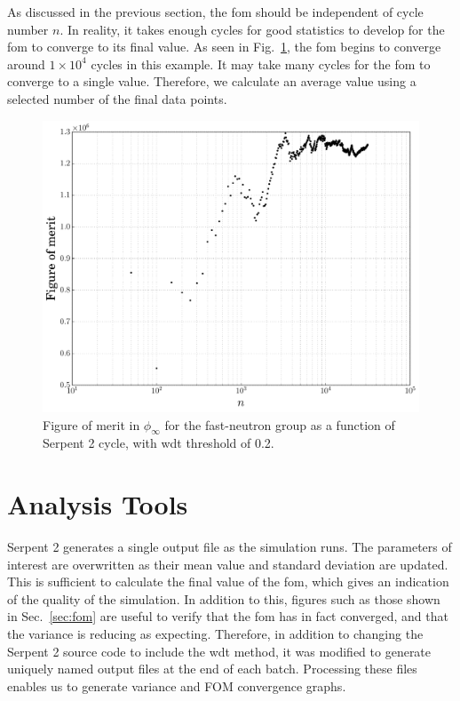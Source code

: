 As discussed in the previous section, the \gls{fom} should be
independent of cycle number $n$. In reality, it takes enough cycles
for good statistics to develop for the \gls{fom} to converge to its
final value. As seen in Fig.~\ref{fig:fom_convergence}, the \gls{fom}
begins to converge around $1\times 10^4$ cycles in this example. 
It may take many cycles for the
\gls{fom} to converge to a single value. Therefore, we calculate an
average value using a selected number of the final data points.
\begin{figure}[hbtp]
  \centering
  \includegraphics[scale=0.5]{images/fom_convergence_example}
  \caption[Figure of merit in $\phi_{\infty}$ for the fast-neutron group as a
    function of Serpent 2 cycle.]{Figure of merit in $\phi_{\infty}$ for the fast-neutron group as a
    function of Serpent 2 cycle, with \gls{wdt} threshold of 0.2.}
  \label{fig:fom_convergence}
\end{figure}

\section{Analysis Tools}
\label{sec:analysis}

Serpent 2 generates a single output file as the simulation runs. The
parameters of interest are overwritten as their mean value and
standard deviation are updated. This is sufficient to calculate the
final value of the \gls{fom}, which gives an indication of the quality
of the simulation. In addition to this, figures such as those shown in
Sec.~\ref{sec:fom} are useful to verify that the \gls{fom} has in fact
converged, and that the variance is reducing as expecting. Therefore,
in addition to changing the Serpent 2 source code to include the
\gls{wdt} method, it was modified to generate uniquely named output
files at the end of each batch. Processing these files enables us to
generate variance and FOM convergence graphs.

